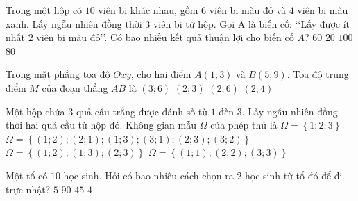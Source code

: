 \begin{ex}%
	Trong một hộp có $10$ viên bi khác nhau, gồm $6$ viên bi màu đỏ và $4$ viên bi màu xanh. Lấy ngẫu nhiên đồng thời $3$ viên bi từ hộp. Gọi A là biến cố: \lq \lq Lấy được ít nhất $2$ viên bi màu
	đỏ\rq \rq. Có bao nhiều kết quả thuận lợi cho biến cố $A$?
	\choice
	{$60$}	
	{$20$}	
	{$100$}	
	{\True $80$}	
\end{ex}
\begin{ex}%
	Trong mặt phẳng toa độ $ Oxy$, cho hai điểm $A(1;3)$ và $B(5;9)$. Toa độ trung điểm $M$ của đoạn thẳng $AB$ là
	\choice
	{\True $(3;6)$}	
	{$(2;3)$}	
	{$(2;6)$}	
	{$(2;4)$}
\end{ex}
\begin{ex}%
	Một hộp chứa $3$ quả cầu trắng được đánh số từ $1$ đến $3$. Lấy ngẫu nhiên đồng thời hai quả cầu từ hộp đó. Không gian mẫu $\Omega$ của phép thử là
	\choice
	{$\Omega =\left\{1;2;3\right\}$}	
	{$\Omega =\left\{\left(1;2\right);\left(2;1\right);\left(1;3\right);\left(3;1\right);\left(2;3\right);\left(3;2\right)\right\}$}	
	{\True $\Omega =\left\{\left(1;2\right);\left(1;3\right);\left(2;3\right)\right\}$}	
	{$\Omega =\left\{\left(1;1\right);\left(2;2\right);\left(3;3\right)\right\}$}
\end{ex}
\begin{ex}%
	Một tổ có $10$ học sinh. Hỏi có bao nhiêu cách chọn ra $2$ học sinh từ tổ đó để đi trực nhật?
	\choice
	{$5$}
	{$90$}
	{\True $45$}
	{$4$}
\end{ex}
